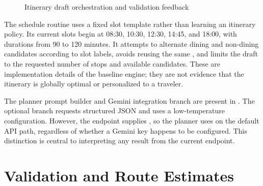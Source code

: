 \begin{figure}[htbp]
    \centering
    \caption{Itinerary draft orchestration and validation feedback}
    \label{fig:itinerary_draft_pipeline}
\end{figure}

The schedule routine uses a fixed slot template rather than learning an itinerary policy. Its current slots begin at 08:30, 10:30, 12:30, 14:45, and 18:00, with durations from 90 to 120 minutes. It attempts to alternate dining and non-dining candidates according to slot labels, avoids reusing the same , and limits the draft to the requested number of stops and available candidates. These are implementation details of the baseline engine; they are not evidence that the itinerary is globally optimal or personalized to a traveler.

The planner prompt builder and Gemini integration branch are present in . The optional branch requests structured JSON and uses a low-temperature configuration. However, the endpoint supplies , so the planner uses  on the default API path, regardless of whether a Gemini key happens to be configured. This distinction is central to interpreting any result from the current endpoint.\section{Validation and Route Estimates}

